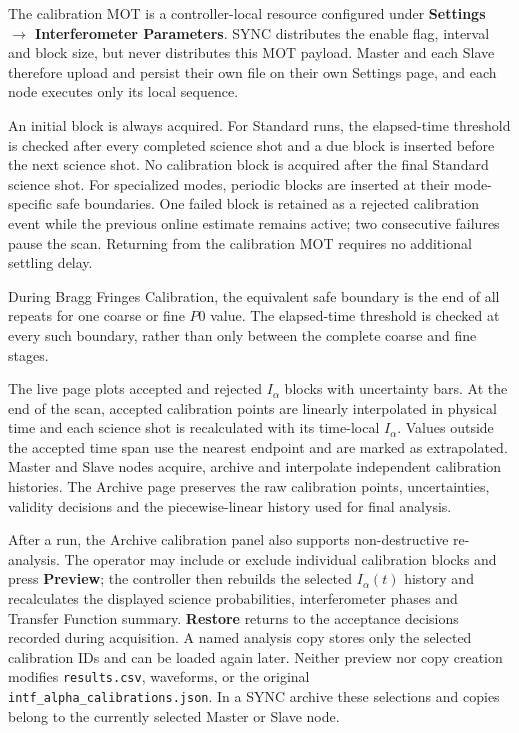 \documentclass[11pt,oneside,openany]{book}
\newcommand{\ui}[1]{\textbf{#1}}
\newcommand{\pathcode}[1]{\nolinkurl{#1}}
\begin{document}
The calibration MOT is a controller-local resource configured under
\ui{Settings $\rightarrow$ Interferometer Parameters}.  SYNC distributes the enable flag,
interval and block size, but never distributes this MOT payload.  Master and each Slave
therefore upload and persist their own file on their own Settings page, and each node
executes only its local sequence.

An initial block is always acquired. For Standard runs, the elapsed-time threshold is
checked after every completed science shot and a due block is inserted before the next
science shot. No calibration block is acquired after the final Standard science shot.
For specialized modes, periodic blocks are inserted at their mode-specific safe
boundaries. One failed block is retained
as a rejected calibration event while the previous online estimate remains active; two
consecutive failures pause the scan.  Returning from the calibration MOT requires no
additional settling delay.

During Bragg Fringes Calibration, the equivalent safe boundary is the end of all repeats
for one coarse or fine $P0$ value.  The elapsed-time threshold is checked at every such
boundary, rather than only between the complete coarse and fine stages.

The live page plots accepted and rejected $I_\alpha$ blocks with uncertainty bars.  At the
end of the scan, accepted calibration points are linearly interpolated in physical time
and each science shot is recalculated with its time-local $I_\alpha$.  Values outside the
accepted time span use the nearest endpoint and are marked as extrapolated.  Master and
Slave nodes acquire, archive and interpolate independent calibration histories.  The
Archive page preserves the raw calibration points, uncertainties, validity decisions and
the piecewise-linear history used for final analysis.

After a run, the Archive calibration panel also supports non-destructive re-analysis.  The
operator may include or exclude individual calibration blocks and press \ui{Preview}; the
controller then rebuilds the selected $I_\alpha(t)$ history and recalculates the displayed
science probabilities, interferometer phases and Transfer Function summary.  \ui{Restore}
returns to the acceptance decisions recorded during acquisition.  A named analysis copy
stores only the selected calibration IDs and can be loaded again later.  Neither preview nor
copy creation modifies \pathcode{results.csv}, waveforms, or the original
\pathcode{intf_alpha_calibrations.json}.  In a SYNC archive these selections and copies belong
to the currently selected Master or Slave node.
\end{document}

